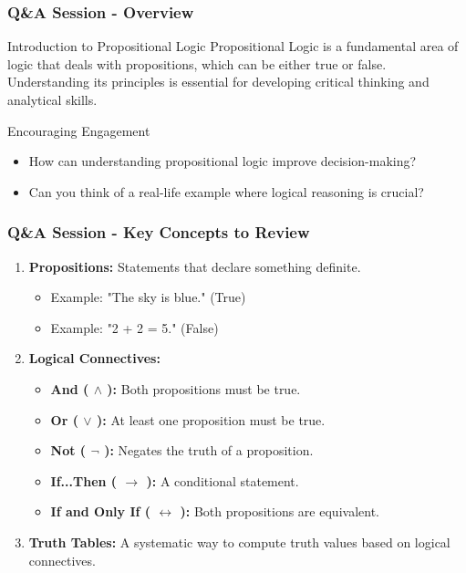 \documentclass[aspectratio=169]{beamer}
\begin{document}
\begin{frame}[fragile]
  \frametitle{Q\&A Session - Overview}
  \begin{block}{Introduction to Propositional Logic}
    Propositional Logic is a fundamental area of logic that deals with propositions, which can be either true or false. 
    Understanding its principles is essential for developing critical thinking and analytical skills.
  \end{block}

  \begin{block}{Encouraging Engagement}
    \begin{itemize}
      \item How can understanding propositional logic improve decision-making?
      \item Can you think of a real-life example where logical reasoning is crucial?
    \end{itemize}
  \end{block}
\end{frame}

\begin{frame}[fragile]
  \frametitle{Q\&A Session - Key Concepts to Review}
  \begin{enumerate}
    \item \textbf{Propositions:} Statements that declare something definite.
    \begin{itemize}
      \item Example: "The sky is blue." (True) 
      \item Example: "2 + 2 = 5." (False)
    \end{itemize}
  
    \item \textbf{Logical Connectives:}
    \begin{itemize}
      \item \textbf{And ( $\land$ ):} Both propositions must be true.
      \item \textbf{Or ( $\lor$ ):} At least one proposition must be true.
      \item \textbf{Not ( $\neg$ ):} Negates the truth of a proposition.
      \item \textbf{If...Then ( $\rightarrow$ ):} A conditional statement.
      \item \textbf{If and Only If ( $\leftrightarrow$ ):} Both propositions are equivalent.
    \end{itemize}
  
    \item \textbf{Truth Tables:} A systematic way to compute truth values based on logical connectives.
  \end{enumerate}
\end{frame}
\end{document}
